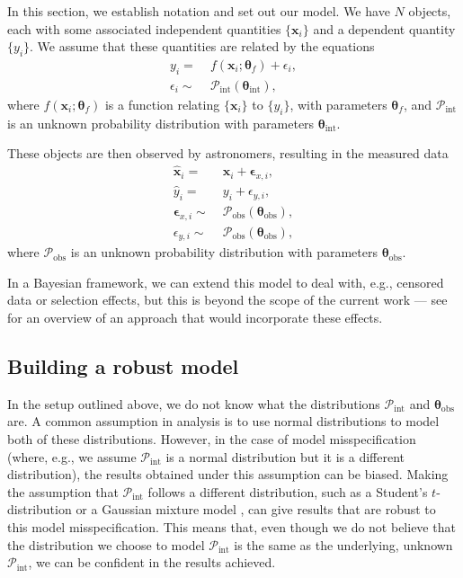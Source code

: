 \documentclass[fleqn,usenatbib]{mnras}
\begin{document}
In this section, we establish notation and set out our model. We
have $N$ objects, each with some associated independent quantities
$\{\boldsymbol{x}_i\}$ and a dependent quantity $\{y_i\}$. We assume that these
quantities are related by the equations
\begin{align}
    y_i =&\; f(\boldsymbol{x}_i; \boldsymbol{\theta}_f) + \epsilon_i, \\
    \epsilon_i \sim&\; \mathcal{P}_{\text{int}} \left( \boldsymbol{\theta}_{\text{int}} \right),
\end{align}
where $f(\boldsymbol{x}_i; \boldsymbol{\theta}_f)$ is a function relating
$\{\boldsymbol{x}_i\}$ to $\{y_i\}$, with parameters $\boldsymbol{\theta}_f$,
and $\mathcal{P}_{\text{int}}$ is an unknown probability distribution with
parameters $\boldsymbol{\theta}_{\text{int}}$.

These objects are then observed by astronomers, resulting in the measured
data
\begin{align}
    \hat{\boldsymbol{x}}_i =&\; \boldsymbol{x}_i + \boldsymbol{\epsilon}_{x,i}, \\
    \hat{y}_i =&\; y_i + \epsilon_{y,i}, \\
    \boldsymbol{\epsilon}_{x,i} \sim&\; \mathcal{P}_{\text{obs}} \left( \boldsymbol{\theta}_{\text{obs}} \right), \\
    \epsilon_{y,i} \sim&\; \mathcal{P}_{\text{obs}} \left( \boldsymbol{\theta}_{\text{obs}} \right),
\end{align}
where $\mathcal{P}_{\text{obs}}$ is an unknown probability distribution with
parameters $\boldsymbol{\theta}_{\text{obs}}$.

In a Bayesian framework, we can extend this model to deal with, e.g., censored
data or selection effects, but this is beyond the scope of the current work ---
see \citet{Kelly:2007} for an overview of an approach that would incorporate
these effects.

\subsection{Building a robust model}
\label{sec:formalism.robust}

In the setup outlined above, we do not know what the distributions
$\mathcal{P}_{\text{int}}$ and $\boldsymbol{\theta}_{\text{obs}}$ are. A common
assumption in analysis is to use normal distributions to model both of these
distributions. However, in the case of model misspecification (where, e.g., we
assume $\mathcal{P}_{\text{int}}$ is a normal distribution but it is a different
distribution), the results obtained under this assumption can be biased.
Making the assumption that $\mathcal{P}_{\text{int}}$ follows a different
distribution, such as a Student's $t$-distribution \citep{??} or a Gaussian
mixture model \citep{??}, can give results that are robust to this model
misspecification. This means that, even though we do not believe that the
distribution we choose to model $\mathcal{P}_{\text{int}}$ is the same as the
underlying, unknown $\mathcal{P}_{\text{int}}$, we can be confident in the
results achieved.
\end{document}
